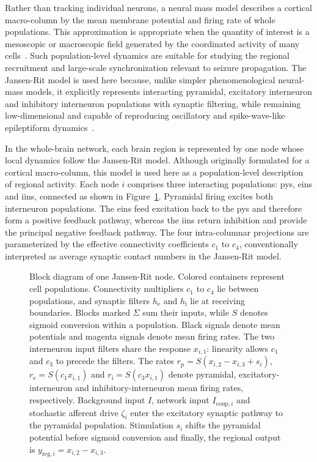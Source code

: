 Rather than tracking individual neurons, a neural mass model describes a cortical macro-column by the mean membrane potential and firing rate of whole populations.
This approximation is appropriate when the quantity of interest is a mesoscopic or macroscopic field generated by the coordinated activity of many cells~\cite{LopesDaSilva1974,Buzsaki2012}.
Such population-level dynamics are suitable for studying the regional recruitment and large-scale synchronization relevant to seizure propagation.
The Jansen-Rit model is used here because, unlike simpler phenomenological neural-mass models, it explicitly represents interacting pyramidal, excitatory interneuron and inhibitory interneuron populations with synaptic filtering, while remaining low-dimensional and capable of reproducing oscillatory and spike-wave-like epileptiform dynamics~\cite{Jansen1995,Wendling2002,Yu2024}.

In the whole-brain network, each brain region is represented by one node whose local dynamics follow the Jansen-Rit model.
Although originally formulated for a cortical macro-column, this model is used here as a population-level description of regional activity.
Each node $i$ comprises three interacting populations: \acp{py}, \acp{ein} and \acp{iin}, connected as shown in Figure~\ref{fig:microcircuit}.
Pyramidal firing excites both interneuron populations.
The \acp{ein} feed excitation back to the \acp{py} and therefore form a positive feedback pathway, whereas the \acp{iin} return inhibition and provide the principal negative feedback pathway.
The four intra-columnar projections are parameterized by the effective connectivity coefficients $c_1$ to $c_4$, conventionally interpreted as average synaptic contact numbers in the Jansen-Rit model.

\begin{figure}
    \centering
    
    \caption{Block diagram of one Jansen-Rit node. Colored containers represent cell populations.
    Connectivity multipliers $c_1$ to $c_4$ lie between populations, and synaptic filters $h_{\mathrm e}$ and $h_{\mathrm i}$ lie at receiving boundaries.
    Blocks marked $\Sigma$ sum their inputs, while $S$ denotes sigmoid conversion within a population.
    Black signals denote mean potentials and magenta signals denote mean firing rates.
    The two interneuron input filters share the response $x_{i,1}$: linearity allows $c_1$ and $c_3$ to precede the filters.
    The rates $r_{\mathrm p}=S(x_{i,2}-x_{i,3}+s_i)$, $r_{\mathrm e}=S(c_1x_{i,1})$ and $r_{\mathrm i}=S(c_3x_{i,1})$ denote pyramidal, excitatory-interneuron and inhibitory-interneuron mean firing rates, respectively.
    Background input $I$, network input $I_{\mathrm{coup},i}$ and stochastic afferent drive $\zeta_i$ enter the excitatory synaptic pathway to the pyramidal population.
    Stimulation $s_i$ shifts the pyramidal potential before sigmoid conversion and finally, the regional output is $y_{\mathrm{reg},i}=x_{i,2}-x_{i,3}$.}
    \label{fig:microcircuit}
\end{figure}

